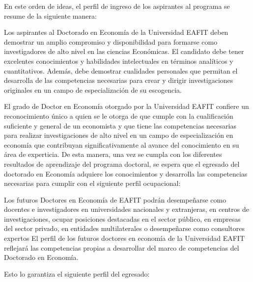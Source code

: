 En este orden de ideas, el perfil de ingreso de los aspirantes al programa se resume de la siguiente manera:

\begin{tcolorbox}[colback=blue!5!white,colframe=blue!75!black,title=Perfil de Ingreso]
  Los aspirantes al Doctorado en Economía de la Universidad EAFIT deben demostrar un amplio compromiso y disponibilidad para formarse como investigadores de alto nivel en las ciencias Económicas. El candidato debe tener excelentes conocimientos y habilidades intelectuales en términos analíticos y cuantitativos. Además, debe demostrar cualidades personales que permitan el desarrolla de las competencias necesarias para crear y dirigir investigaciones originales en un campo de especialización de su escogencia.
\end{tcolorbox}

El grado de Doctor en Economía otorgado por la Universidad EAFIT confiere un reconocimiento único a quien se le otorga de que cumple con la cualificación suficiente y general de un economista y que tiene las competencias necesarias para realizar investigaciones de alto nivel en un campo de especialización en economía que contribuyan significativamente al avance del conocimiento en su área de experticia. De esta manera, una vez se cumpla con los diferentes resultados de aprendizaje del programa doctoral, se espera que el egresado del doctorado en Economía adquiere los conocimientos y desarrolla las competencias necesarias para cumplir con el siguiente perfil ocupacional:

\begin{tcolorbox}[colback=blue!5!white,colframe=blue!75!black,title=Perfil Ocupacional]
  Los futuros Doctores en Economía de EAFIT podrán desempeñarse como docentes e investigadores en universidades nacionales y extranjeras, en centros de investigaciones, ocupar posiciones destacadas en el sector público, en empresas del sector privado, en entidades multilaterales o desempeñarse como consultores expertos El perfil de los futuros doctores en economía de la Universidad EAFIT reflejará las competencias propias a desarrollar del marco de competencias del Doctorado en Economía. 

\end{tcolorbox}

Esto lo garantiza el siguiente perfil del egresado:

